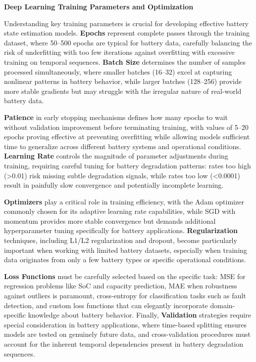 \textbf{Deep Learning Training Parameters and Optimization}

Understanding key training parameters is crucial for developing effective battery state estimation models. \textbf{Epochs} represent complete passes through the training dataset, where 50--500 epochs are typical for battery data, carefully balancing the risk of underfitting with too few iterations against overfitting with excessive training on temporal sequences. \textbf{Batch Size} determines the number of samples processed simultaneously, where smaller batches (16--32) excel at capturing nonlinear patterns in battery behavior, while larger batches (128--256) provide more stable gradients but may struggle with the irregular nature of real-world battery data.

\textbf{Patience} in early stopping mechanisms defines how many epochs to wait without validation improvement before terminating training, with values of 5--20 epochs proving effective at preventing overfitting while allowing models sufficient time to generalize across different battery systems and operational conditions. \textbf{Learning Rate} controls the magnitude of parameter adjustments during training, requiring careful tuning for battery degradation patterns: rates too high (>0.01) risk missing subtle degradation signals, while rates too low (<0.0001) result in painfully slow convergence and potentially incomplete learning.

\textbf{Optimizers} play a critical role in training efficiency, with the Adam optimizer commonly chosen for its adaptive learning rate capabilities, while SGD with momentum provides more stable convergence but demands additional hyperparameter tuning specifically for battery applications. \textbf{Regularization} techniques, including L1/L2 regularization and dropout, become particularly important when working with limited battery datasets, especially when training data originates from only a few battery types or specific operational conditions.

\textbf{Loss Functions} must be carefully selected based on the specific task: MSE for regression problems like SoC and capacity prediction, MAE when robustness against outliers is paramount, cross-entropy for classification tasks such as fault detection, and custom loss functions that can elegantly incorporate domain-specific knowledge about battery behavior. Finally, \textbf{Validation} strategies require special consideration in battery applications, where time-based splitting ensures models are tested on genuinely future data, and cross-validation procedures must account for the inherent temporal dependencies present in battery degradation sequences.



